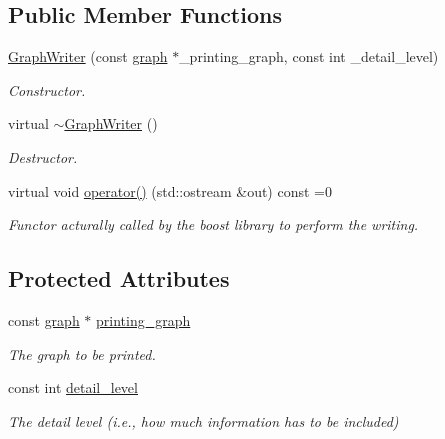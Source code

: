 \subsection*{Public Member Functions}
\begin{DoxyCompactItemize}
\item 
\hyperlink{classGraphWriter_a52eaf829f5b8434060674e3f694308f1}{Graph\+Writer} (const \hyperlink{structgraph}{graph} $\ast$\+\_\+printing\+\_\+graph, const int \+\_\+detail\+\_\+level)
\begin{DoxyCompactList}\small\item\em Constructor. \end{DoxyCompactList}\item 
virtual \hyperlink{classGraphWriter_a65ec002436c260b3001cffd179da6890}{$\sim$\+Graph\+Writer} ()
\begin{DoxyCompactList}\small\item\em Destructor. \end{DoxyCompactList}\item 
virtual void \hyperlink{classGraphWriter_ae5b82438e8bf837f7a0f05b9df648b69}{operator()} (std\+::ostream \&out) const =0
\begin{DoxyCompactList}\small\item\em Functor acturally called by the boost library to perform the writing. \end{DoxyCompactList}\end{DoxyCompactItemize}
\subsection*{Protected Attributes}
\begin{DoxyCompactItemize}
\item 
const \hyperlink{structgraph}{graph} $\ast$ \hyperlink{classGraphWriter_ac96afdb56e6ac1fec12089e973fa25fa}{printing\+\_\+graph}
\begin{DoxyCompactList}\small\item\em The graph to be printed. \end{DoxyCompactList}\item 
const int \hyperlink{classGraphWriter_a3e641e437697cddd0c2180b24a0a41cd}{detail\+\_\+level}
\begin{DoxyCompactList}\small\item\em The detail level (i.\+e., how much information has to be included) \end{DoxyCompactList}\end{DoxyCompactItemize}


